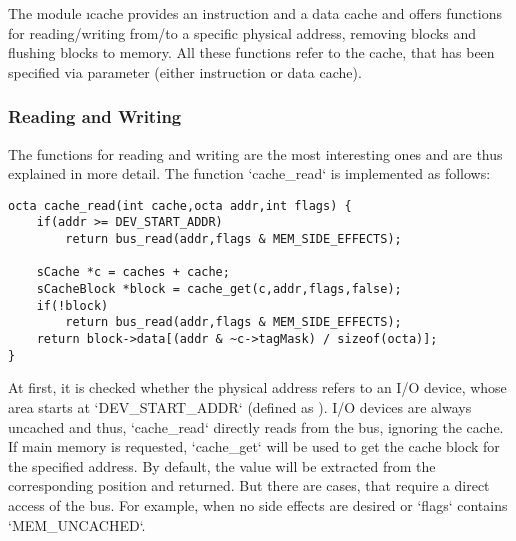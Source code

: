 The module \i{cache} provides an instruction and a data cache and offers functions for reading/writing from/to a specific physical address, removing blocks and flushing blocks to memory. All these functions refer to the cache, that has been specified via parameter (either instruction or data cache).

\subsubsection{Reading and Writing}

The functions for reading and writing are the most interesting ones and are thus explained in more detail. The function `cache_read` is implemented as follows:
\begin{lstlisting}[language=GIMMIXC,caption={Implementation of {\tt cache\_read}}]
octa cache_read(int cache,octa addr,int flags) {
	if(addr >= DEV_START_ADDR)
		return bus_read(addr,flags & MEM_SIDE_EFFECTS);

	sCache *c = caches + cache;
	sCacheBlock *block = cache_get(c,addr,flags,false);
	if(!block)
		return bus_read(addr,flags & MEM_SIDE_EFFECTS);
	return block->data[(addr & ~c->tagMask) / sizeof(octa)];
}
\end{lstlisting}
At first, it is checked whether the physical address refers to an I/O device, whose area starts at `DEV_START_ADDR` (defined as ). I/O devices are always uncached and thus, `cache_read` directly reads from the bus, ignoring the cache. If main memory is requested, `cache_get` will be used to get the cache block for the specified address. By default, the value will be extracted from the corresponding position and returned. But there are cases, that require a direct access of the bus. For example, when no side effects are desired or `flags` contains `MEM_UNCACHED`.

